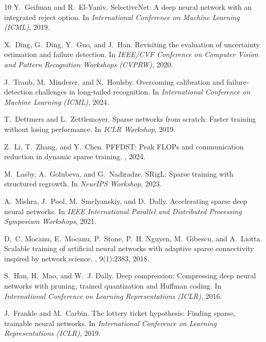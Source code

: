 \documentclass[letterpaper]{article} %
\begin{document}
\begin{thebibliography}{10}
Y.~Geifman and R.~El-Yaniv.
\newblock SelectiveNet: A deep neural network with an integrated reject option.
\newblock In {\em International Conference on Machine Learning (ICML)}, 2019.

X.~Ding, G.~Ding, Y.~Guo, and J.~Han.
\newblock Revisiting the evaluation of uncertainty estimation and failure detection.
\newblock In {\em IEEE/CVF Conference on Computer Vision and Pattern Recognition Workshops (CVPRW)}, 2020.

J.~Traub, M.~Minderer, and N.~Houlsby.
\newblock Overcoming calibration and failure-detection challenges in long-tailed recognition.
\newblock In {\em International Conference on Machine Learning (ICML)}, 2024.

T.~Dettmers and L.~Zettlemoyer.
\newblock Sparse networks from scratch: Faster training without losing performance.
\newblock In {\em ICLR Workshop}, 2019.

Z.~Li, T.~Zhang, and Y.~Chen.
\newblock PFFDST: Peak FLOPs and communication reduction in dynamic sparse training.
, 2024.

M.~Lasby, A.~Golubeva, and G.~Nadiradze.
\newblock SRigL: Sparse training with structured regrowth.
\newblock In {\em NeurIPS Workshop}, 2023.

A.~Mishra, J.~Pool, M.~Smelyanskiy, and D.~Dally.
\newblock Accelerating sparse deep neural networks.
\newblock In {\em IEEE International Parallel and Distributed Processing Symposium Workshops}, 2021.

D.~C. Mocanu, E.~Mocanu, P.~Stone, P.~H. Nguyen, M.~Gibescu, and A.~Liotta.
\newblock Scalable training of artificial neural networks with adaptive sparse connectivity inspired by network science.
, 9(1):2383, 2018.

S.~Han, H.~Mao, and W.~J. Dally.
\newblock Deep compression: Compressing deep neural networks with pruning, trained quantization and Huffman coding.
\newblock In {\em International Conference on Learning Representations (ICLR)}, 2016.

J.~Frankle and M.~Carbin.
\newblock The lottery ticket hypothesis: Finding sparse, trainable neural networks.
\newblock In {\em International Conference on Learning Representations (ICLR)}, 2019.


\end{thebibliography}
\end{document}
